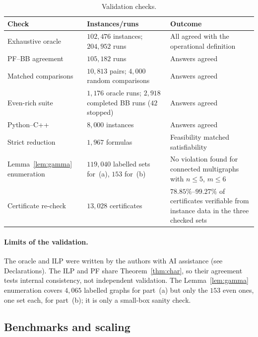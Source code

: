 \begin{table}[!t]
\caption{Validation checks.}
\label{tab:validation}
\footnotesize
\begin{tabular*}{\textwidth}{@{\extracolsep\fill}p{}p{}p{}}
\toprule
Check & Instances/runs & Outcome \\
\midrule
Exhaustive oracle & $102{,}476$ instances; $204{,}952$ runs & All agreed with the operational definition \\
PF--BB agreement & $105{,}182$ runs & Answers agreed \\
Matched comparisons & $10{,}813$ pairs; $4{,}000$ random comparisons & Answers agreed \\
Even-rich suite & $1{,}176$ oracle runs; $2{,}918$ completed BB runs ($42$ stopped) & Answers agreed \\
Python--C++ & $8{,}000$ instances & Answers agreed \\
Strict reduction & $1{,}967$ formulas & Feasibility matched satisfiability \\
Lemma~\ref{lem:gamma} enumeration & $119{,}040$ labelled sets for~(a), $153$ for~(b) & No violation found for connected multigraphs with $n\le5$, $m\le6$ \\
Certificate re-check & $13{,}028$ certificates & $78.85\%$--$99.27\%$ of \NO{} certificates verifiable from instance data in the three checked sets \\
\bottomrule
\end{tabular*}
\end{table}

\paragraph{Limits of the validation.} The oracle and ILP were written by the authors with AI assistance (see Declarations). The ILP and PF share Theorem~\ref{thm:char}, so their agreement tests internal consistency, not independent validation. The Lemma~\ref{lem:gamma} enumeration covers $4{,}065$ labelled graphs for part~(a) but only the $153$ even ones, one set each, for part~(b); it is only a small-box sanity check.

\subsection{Benchmarks and scaling}\label{sec:scope}


